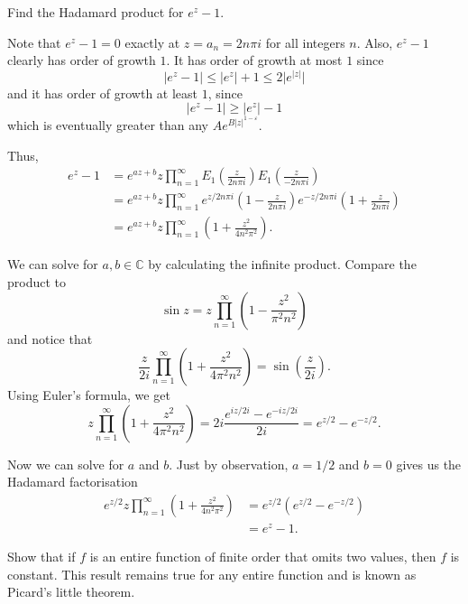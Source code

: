 \documentclass[12 pt, letterpaper]{hmcpset}
\begin{document}
\begin{problem}[10. (a)]
	Find the Hadamard product for $e^{z} - 1$.
\end{problem}

\begin{solution}
	Note that $e^{z} - 1 = 0$ exactly at $z = a_{n} = 2 n \pi i$ for all integers $n$. Also, $e^{z} - 1$ clearly has order of growth $1$. It has order of growth at most $1$ since
	\[
		\lvert e^{z} - 1 \rvert \le \lvert e^{z} \rvert + 1 \le 2 \lvert e^{\lvert z \rvert} \rvert
	\]
	and it has order of growth at least $1$, since
	\[
		\lvert e^{z} - 1 \rvert \ge \lvert e^{z} \rvert - 1
	\]
	which is eventually greater than any $A e^{B \lvert z \rvert^{1 - \varepsilon}}$.

	Thus,
	\begin{align*}
		e^{z} - 1 & = e^{az + b} z \prod_{n = 1}^{\infty} E_{1} \left ( \frac{z}{2n \pi i} \right ) E_{1} \left ( \frac{z}{- 2n \pi i} \right ) \\
			  & = e^{az + b} z \prod_{n = 1}^{\infty} e^{z / 2 n \pi i} \left ( 1 - \frac{z}{2n \pi i} \right )  e^{- z / 2n \pi i} \left ( 1 + \frac{z}{2n \pi i} \right ) \\
			  & = e^{az + b} z \prod_{n = 1}^{\infty} \left ( 1 + \frac{z^{2}}{4 n^{2} \pi^{2}} \right ).
	\end{align*}

	We can solve for $a, b \in \mathbb{C}$ by calculating the infinite product. Compare the product to
	\[
		\sin{z} = z \prod_{n = 1}^{\infty} \left ( 1 - \frac{z^{2}}{\pi^{2} n^{2}} \right )
	\]
	and notice that
	\[
		\frac{z}{2i} \prod_{n = 1}^{\infty} \left ( 1 + \frac{z^{2}}{4 \pi^{2} n^{2}} \right ) = \sin{\left ( \frac{z}{2 i} \right )}.
	\]
	Using Euler's formula, we get
	\[
		z \prod_{n = 1}^{\infty} \left ( 1 + \frac{z^{2}}{4 \pi^{2} n^{2}} \right ) = 2i \frac{e^{iz / 2i} - e^{-iz / 2i}}{2i} = e^{z / 2} - e^{-z / 2}.
	\]

	Now we can solve for $a$ and $b$. Just by observation, $a = 1/2$ and $b = 0$ gives us the Hadamard factorisation
	\begin{align*}
		e^{z/2} z \prod_{n = 1}^{\infty} \left ( 1 + \frac{z^{2}}{4 n^{2} \pi^{2}} \right ) & = e^{z/2} (e^{z/2} - e^{-z/2}) \\
												       & = e^{z} - 1.
	\end{align*}
\end{solution}

\pagebreak

\begin{problem}[11.]
	Show that if  $f$ is an entire function of finite order that omits two values, then $f$ is constant. This result remains true for any entire function and is known as Picard's little theorem.
\end{problem}
\end{document}
